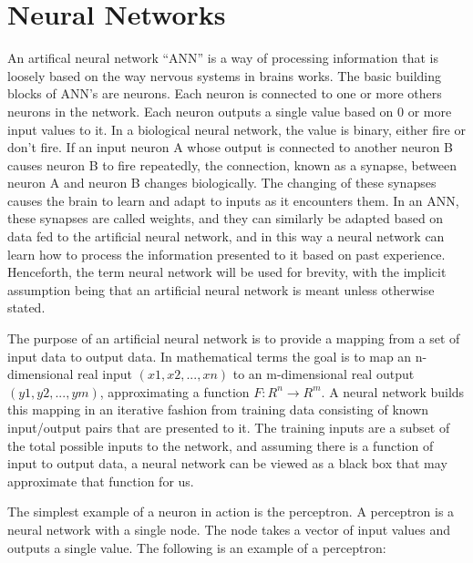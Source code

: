 \chapter[Neural Networks]{Neural Networks}
An artifical neural network ``ANN'' is a way of processing information that is loosely based on the way nervous systems in brains works. 
The basic building blocks of ANN's are neurons. 
Each neuron is connected to one or more others neurons in the network. 
Each neuron outputs a single value based on 0 or more input values to it. 
In a biological neural network, the value is binary, either fire or don't fire. 
If an input neuron A whose output is connected to another neuron B causes neuron B to fire repeatedly, the connection, known as a synapse, between neuron A and neuron B changes biologically. 
The changing of these synapses causes the brain to learn and adapt to inputs as it encounters them. 
In an ANN, these synapses are called weights, and they can similarly be adapted based on data fed to the artificial neural network, and in this way a neural network can learn how to process the information presented to it based on past experience. 
Henceforth, the term neural network will be used for brevity, with the implicit assumption being that an artificial neural network is meant unless otherwise stated.

The purpose of an artificial neural network is to provide a mapping from a set of input data to output data. 
In mathematical terms the goal is to map an n-dimensional real input
\begin{math}(x1,x2,...,xn)\end{math} to an m-dimensional real output \begin{math}(y1,y2,...,ym)\end{math}, 
approximating a function \begin{math} F : R^n \rightarrow R^m. \end{math}\cite{rojas1} 
A neural network builds this mapping in an iterative fashion from training data consisting of known input/output pairs that are presented to it. The training inputs are a subset of the total possible inputs to the network, and assuming there is a function of input to output data, a neural network can be viewed as a black box that may approximate that function for us.




The simplest example of a neuron in action is the perceptron. A perceptron is a neural network with a single node. The node takes a vector of input values and outputs a single value. The following is an example of a perceptron: 


